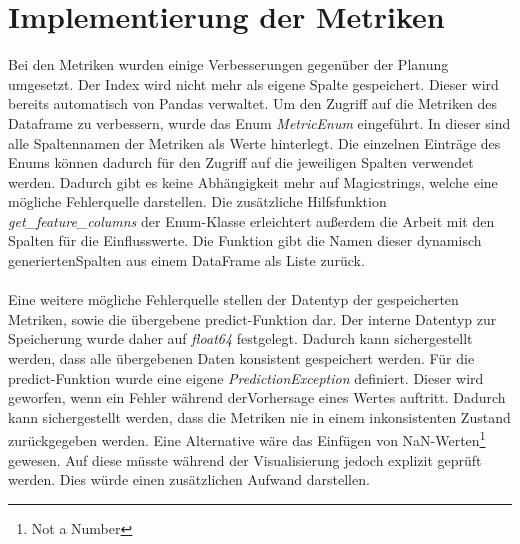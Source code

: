 

\section{Implementierung der Metriken}
\label{sec:impl_metrics}


Bei den Metriken wurden einige Verbesserungen gegenüber der Planung umgesetzt. Der Index wird nicht mehr als eigene Spalte gespeichert. Dieser wird bereits automatisch von Pandas verwaltet.
Um den Zugriff auf die Metriken des Dataframe zu verbessern, wurde das Enum \emph{MetricEnum} eingeführt. In dieser sind alle Spaltennamen der Metriken als Werte hinterlegt. Die einzelnen Einträge des Enums können dadurch für den Zugriff auf die jeweiligen Spalten verwendet werden. Dadurch gibt es keine Abhängigkeit mehr auf Magicstrings, welche eine mögliche Fehlerquelle darstellen. Die zusätzliche Hilfsfunktion \emph{get\_feature\_columns} der Enum-Klasse erleichtert außerdem die Arbeit mit den Spalten für die Einflusswerte. Die Funktion gibt die Namen dieser dynamisch generierten\linebreak Spalten aus einem DataFrame als Liste zurück.\\\\
\noindent Eine weitere mögliche Fehlerquelle stellen der Datentyp der gespeicherten Metriken, sowie die übergebene predict-Funktion dar. Der interne Datentyp zur Speicherung wurde daher auf \emph{float64} festgelegt. Dadurch kann sichergestellt werden, dass alle übergebenen Daten konsistent gespeichert werden. Für die predict-Funktion wurde eine eigene \emph{PredictionException} definiert. Dieser wird geworfen, wenn ein Fehler während der\linebreak Vorhersage eines Wertes auftritt. Dadurch kann sichergestellt werden, dass die Metriken nie in einem inkonsistenten Zustand zurückgegeben werden. Eine Alternative wäre das Einfügen von NaN-Werten\footnote{Not a Number} gewesen. Auf diese müsste während der Visualisierung jedoch explizit geprüft werden. Dies würde einen zusätzlichen Aufwand darstellen.

